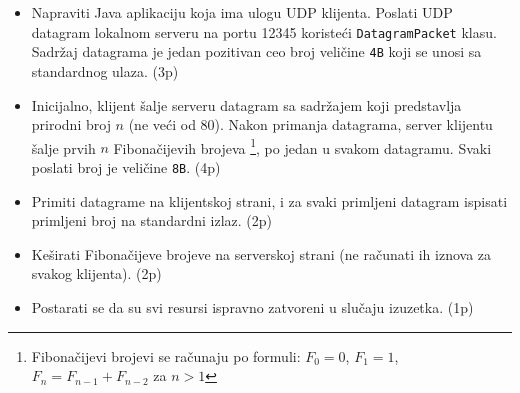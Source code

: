 \documentclass[]{article}
\begin{document}
\begin{enumerate}
\begin{itemize}
    \item Napraviti Java aplikaciju koja ima ulogu UDP klijenta. Poslati UDP datagram lokalnom serveru na portu 12345 koriste\'c{}i \texttt{DatagramPacket} klasu. Sadr\v{z}aj datagrama je jedan pozitivan ceo broj veli\v{c}ine \texttt{4B} koji se unosi sa standardnog ulaza. \hfill (3p)
    \item Inicijalno, klijent \v{s}alje serveru datagram sa sadr\v{z}ajem koji predstavlja prirodni broj $n$ (ne ve\'c{}i od $80$). Nakon primanja datagrama, server klijentu \v{s}alje prvih $n$ Fibona\v{c}ijevih brojeva \footnote{Fibona\v{c}ijevi brojevi se ra\v{c}unaju po formuli: $F_0 = 0$, $F_1 = 1$, $F_n = F_{n-1} + F_{n-2}$ za $n > 1$}, po jedan u svakom datagramu. Svaki poslati broj je veli\v{c}ine \texttt{8B}. \hfill (4p)
    \item Primiti datagrame na klijentskoj strani, i za svaki primljeni datagram ispisati primljeni broj na standardni izlaz. \hfill (2p)
    \item Ke\v{s}irati Fibona\v{c}ijeve brojeve na serverskoj strani (ne ra\v{c}unati ih iznova za svakog klijenta). \hfill (2p)
    \item Postarati se da su svi resursi ispravno zatvoreni u slu\v{c}aju izuzetka. \hfill (1p)
  \end{itemize}
\end{enumerate}
\end{document}

